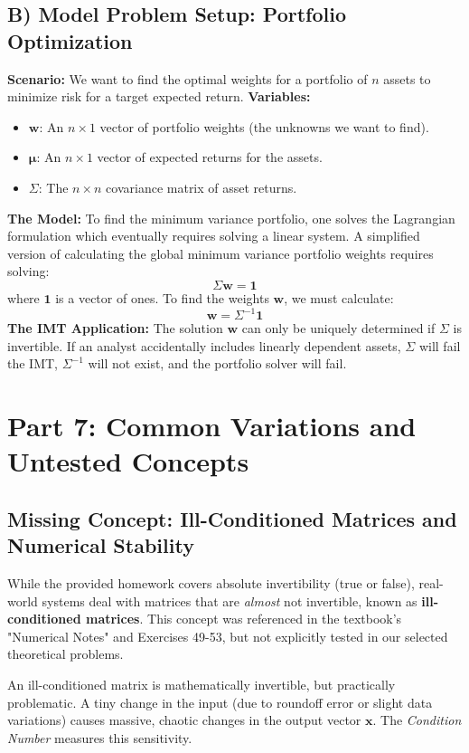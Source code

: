\documentclass[12pt]{article}
\begin{document}
\subsection{B) Model Problem Setup: Portfolio Optimization}
\textbf{Scenario:} We want to find the optimal weights for a portfolio of $n$ assets to minimize risk for a target expected return.
\textbf{Variables:}
\begin{itemize}
    \item $\mathbf{w}$: An $n \times 1$ vector of portfolio weights (the unknowns we want to find).
    \item $\boldsymbol{\mu}$: An $n \times 1$ vector of expected returns for the assets.
    \item $\Sigma$: The $n \times n$ covariance matrix of asset returns.
\end{itemize}
\textbf{The Model:} 
To find the minimum variance portfolio, one solves the Lagrangian formulation which eventually requires solving a linear system. A simplified version of calculating the global minimum variance portfolio weights requires solving:
\[
\Sigma \mathbf{w} = \mathbf{1}
\]
where $\mathbf{1}$ is a vector of ones. 
To find the weights $\mathbf{w}$, we must calculate:
\[
\mathbf{w} = \Sigma^{-1} \mathbf{1}
\]
\textbf{The IMT Application:} The solution $\mathbf{w}$ can only be uniquely determined if $\Sigma$ is invertible. If an analyst accidentally includes linearly dependent assets, $\Sigma$ will fail the IMT, $\Sigma^{-1}$ will not exist, and the portfolio solver will fail.


\section{Part 7: Common Variations and Untested Concepts}

\subsection{Missing Concept: Ill-Conditioned Matrices and Numerical Stability}
While the provided homework covers absolute invertibility (true or false), real-world systems deal with matrices that are \emph{almost} not invertible, known as \textbf{ill-conditioned matrices}. This concept was referenced in the textbook's "Numerical Notes" and Exercises 49-53, but not explicitly tested in our selected theoretical problems.

An ill-conditioned matrix is mathematically invertible, but practically problematic. A tiny change in the input (due to roundoff error or slight data variations) causes massive, chaotic changes in the output vector $\mathbf{x}$. The \emph{Condition Number} measures this sensitivity.
\end{document}
